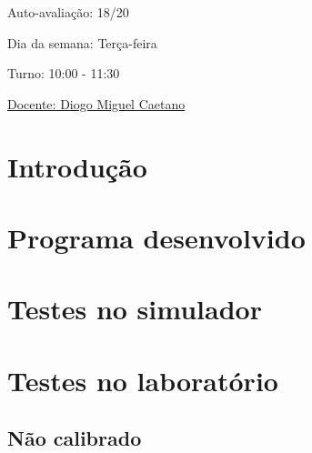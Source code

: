 \documentclass[11pt]{article}
\begin{document}
\begin{titlepage}
\vspace{1cm}

Auto-avaliação: 18/20

\vspace{1.5 cm}

Dia da semana: Terça-feira

Turno: 10:00 - 11:30
\vspace{1.5 cm}

\underline{Docente: Diogo Miguel Caetano} \\

\end{titlepage}

\setcounter{page}{0}

\thispagestyle{empty} %
\tableofcontents 

\newpage

\section{Introdução}\label{sec:Introdução}
    

\section{Programa desenvolvido}\label{sec:Programa desenvolvido}
    

\section{Testes no simulador}\label{sec:Testes no simulador}
    

\section{Testes no laboratório}\label{sec:Testes no laboratório}
    \subsection{Não calibrado}\label{subsec:Não calibrado}
        
\end{document}
